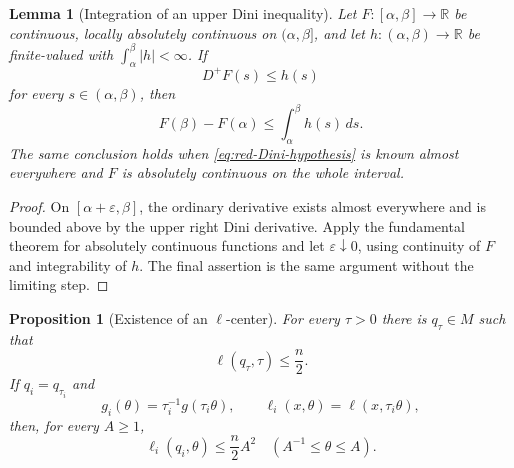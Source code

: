 \documentclass[10pt]{coll-l}
\newtheorem{lemma}[theorem]{Lemma}
\newtheorem{proposition}[theorem]{Proposition}
\theoremstyle{definition}
\theoremstyle{remark}
\numberwithin{section}{chapter}
\numberwithin{equation}{chapter}
\begin{document}
\begin{lemma}[Integration of an upper Dini inequality]
\label{lem:red-Dini-integration}
Let $F:[\alpha,\beta]\to\mathbb R$ be continuous, locally absolutely
continuous on $(\alpha,\beta]$, and let
$h:(\alpha,\beta)\to\mathbb R$ be finite-valued with
$\int_\alpha^\beta|h|<\infty$.  If
\begin{equation}
                       D^+F(s)\leq h(s)                 \label{eq:red-Dini-hypothesis}
\end{equation}
for every $s\in(\alpha,\beta)$, then
\begin{equation}
                 F(\beta)-F(\alpha)
                    \leq\int_\alpha^\beta h(s)\,ds.    \label{eq:red-Dini-conclusion}
\end{equation}
The same conclusion holds when \eqref{eq:red-Dini-hypothesis} is known
almost everywhere and $F$ is absolutely continuous on the whole interval.
\end{lemma}

\begin{proof}
On $[\alpha+\varepsilon,\beta]$, the ordinary derivative exists almost
everywhere and is bounded above by the upper right Dini derivative.  Apply
the fundamental theorem for absolutely continuous functions and let
$\varepsilon\downarrow0$, using continuity of $F$ and integrability of $h$.
The final assertion is the same argument without the limiting step.
\end{proof}

\begin{proposition}[Existence of an $\ell$-center]
\label{prop:red-ell-center}
For every $\tau>0$ there is $q_\tau\in M$ such that
\begin{equation}
                         \ell(q_\tau,\tau)\leq\frac n2.
                                                               \label{eq:red-ell-center}
\end{equation}
If $q_i=q_{\tau_i}$ and
\begin{equation}
 g_i(\theta)=\tau_i^{-1}g(\tau_i\theta),
 \qquad \ell_i(x,\theta)=\ell(x,\tau_i\theta),          \label{eq:red-blowdown-definition-preview}
\end{equation}
then, for every $A\geq1$,
\begin{equation}
              \ell_i(q_i,\theta)\leq\frac n2A^2
              \quad(A^{-1}\leq\theta\leq A).           \label{eq:red-center-time-control}
\end{equation}
\end{proposition}
\end{document}
